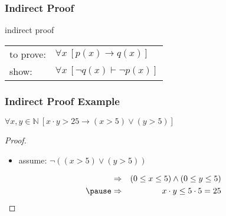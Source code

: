 \documentclass[dvipsnames]{beamer}
\begin{document}

\begin{frame}
  \frametitle{Indirect Proof}

  \begin{block}{indirect proof}
    \begin{tabular}{ll}
      to prove: & $\forall x~[p(x) \rightarrow q(x)]$\\
      show:     & $\forall x~[\neg q(x) \vdash \neg p(x)]$
    \end{tabular}
  \end{block}
\end{frame}

\begin{frame}
  \frametitle{Indirect Proof Example}

  \begin{theorem}
    $\forall x,y \in \mathbb{N}~[x \cdot y > 25
      \rightarrow (x > 5) \vee (y > 5)]$
  \end{theorem}

  \pause
  \begin{proof}
    \begin{itemize}
      \item assume: $\neg ((x > 5) \vee (y > 5))$
    \end{itemize}

    \vspace{-2em}
    \begin{eqnarray*}
      & \Rightarrow & (0 \leq x \leq 5) \wedge (0 \leq y \leq 5)\\\pause
      & \Rightarrow & x \cdot y \leq 5 \cdot 5 = 25
    \end{eqnarray*}
  \end{proof}
\end{frame}
\end{document}
